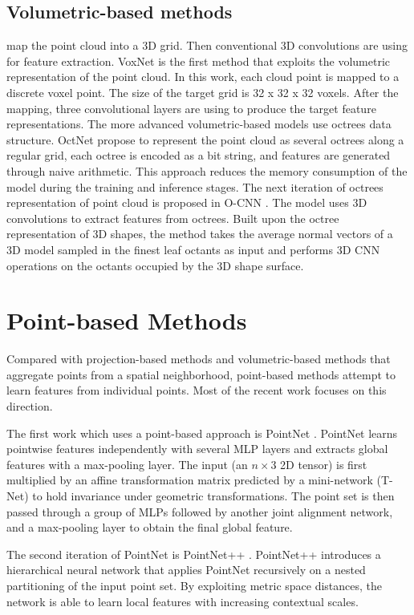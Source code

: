 \subsection{Volumetric-based methods} map the point cloud into a 3D grid. Then conventional 3D convolutions are using for feature extraction.
VoxNet \parencite{maturana_voxnet_2015} is the first method that exploits the volumetric representation of the point cloud. In this work, each cloud point is mapped to a discrete voxel point. The size of the target grid is 32 x 32 x 32 voxels. After the mapping, three convolutional layers are using to produce the target feature representations.
The more advanced volumetric-based models use octrees data structure. OctNet \parencite{riegler_octnet_2017} propose to represent the point cloud as several octrees along a regular grid, each octree is encoded as a bit string, and features are generated through naive arithmetic. This approach reduces the memory consumption of the model during the training and inference stages.
The next iteration of octrees representation of point cloud is proposed in O-CNN \parencite{wang_o-cnn_2017}. The model uses 3D convolutions to extract features from octrees. Built upon the octree representation of 3D shapes, the method takes the average normal vectors of a 3D model sampled in the finest leaf octants as input and performs 3D CNN operations on the octants occupied by the 3D shape surface.

\section{Point-based Methods}
\label{Point-based Methods}
Compared with projection-based methods and volumetric-based methods that aggregate points from a spatial neighborhood, point-based methods attempt to learn features from individual points. Most of the recent work focuses on this direction.

The first work which uses a point-based approach is PointNet \parencite{qi_pointnet_2017}. PointNet learns pointwise features independently with several MLP layers and extracts global features with a max-pooling layer. The input (an $n \times 3$ 2D tensor) is first multiplied by an affine transformation matrix predicted by a mini-network (T-Net) to hold invariance under geometric transformations. The point set is then passed through a group of MLPs followed by another joint alignment network, and a max-pooling layer to obtain the final global feature.

The second iteration of PointNet is PointNet++ \parencite{qi_pointnet_2017-1}. PointNet++ introduces a hierarchical neural network that applies PointNet recursively on a nested partitioning of the input point set. By exploiting metric space distances, the network is able to learn local features with increasing contextual scales.

